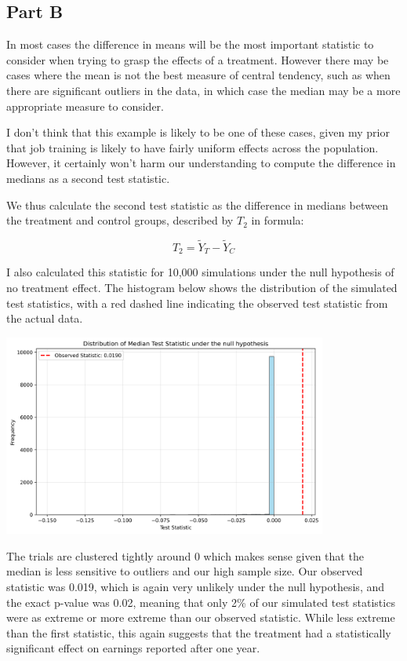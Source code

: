 \documentclass[12pt]{article}
\begin{document}
\subsection{Part B}

In most cases the difference in means will be the most important statistic to consider when trying to grasp the effects of a treatment. However there may be cases where the mean is not the best measure of central tendency, such as when there are significant outliers in the data, in which case the median may be a more appropriate measure to consider.
\newline

I don't think that this example is likely to be one of these cases, given my prior that job training is likely to have fairly uniform effects across the population. However, it certainly won't harm our understanding to compute the difference in medians as a second test statistic.
\newline

We thus calculate the second test statistic as the difference in medians between the treatment and control groups, described by $T_2$ in formula:

\[T_2 = \tilde{Y}_T - \tilde{Y}_C\]

I also calculated this statistic for 10,000 simulations under the null hypothesis of no treatment effect. The histogram below shows the distribution of the simulated test statistics, with a red dashed line indicating the observed test statistic from the actual data.

\vspace*{2em}
\includegraphics[width=0.8\textwidth]{stat2_graph.png}
\vspace*{2em}

The trials are clustered tightly around 0 which makes sense given that the median is less sensitive to outliers and our high sample size. Our observed statistic was 0.019, which is again very unlikely under the null hypothesis, and the exact p-value was 0.02, meaning that only 2\% of our simulated test statistics were as extreme or more extreme than our observed statistic. While less extreme than the first statistic, this again suggests that the treatment had a statistically significant effect on earnings reported after one year.
\end{document}
